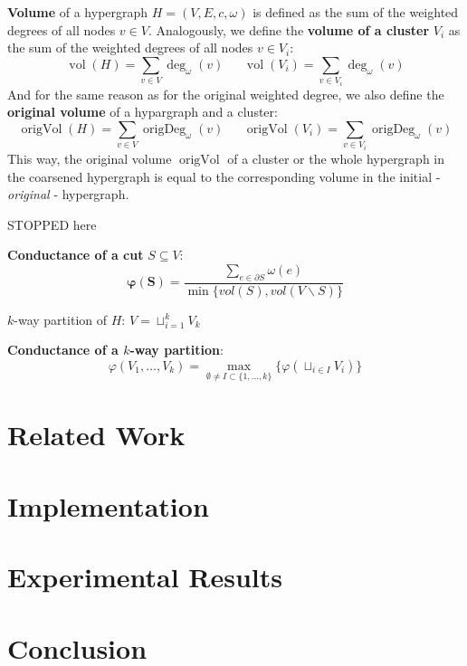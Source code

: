 \documentclass[acmsmall,nonacm,screen,review]{acmart}
\DeclareMathOperator{\vol}{vol}
\DeclareMathOperator{\origVol}{origVol}
\DeclareMathOperator{\origDeg}{origDeg}
\begin{document}
\textbf{Volume} of a hypergraph $H = (V, E, c, \omega)$ is defined as the 
sum of the weighted degrees of all nodes $v \in V$. Analogously, we define the \textbf{volume of a cluster} $V_i$ as the sum 
of the weighted degrees of all nodes $v \in V_i$:
\[\vol(H) = \sum_{v \in V} \deg_\omega(v) \ \ \ \ \ \ \
\vol(V_i) = \sum_{v \in V_i} \deg_\omega(v)\]
And for the same reason as for the original weighted degree, we also define 
the \textbf{original volume} of a hypargraph and a cluster:
\[\origVol(H) = \sum_{v \in V} \origDeg_\omega(v) \ \ \ \ \ \ \
\origVol(V_i) = \sum_{v \in V_i} \origDeg_\omega(v)\]
This way, the original volume $\origVol$ of a cluster or the whole hypergraph 
in the coarsened hypergraph is equal to the corresponding volume in the initial 
- \textit{original} - hypergraph.


STOPPED here

  \textbf{Conductance of a cut} $S \subseteq V$: 
  \[\mathbf{\varphi(S)} = \frac{\sum_{e \in \partial S}\omega(e)}{\min\{vol(S), vol(V \backslash S)\}}\]

  $k$-way partition of $H$: $V = \sqcup_{i = 1}^{k} V_k$

  \textbf{Conductance of a $k$-way partition}: 
  \[\varphi(V_1, \dots, V_k) = \max_{\emptyset \neq I \subset \{1, \dots, k\}}\{\varphi(\sqcup_{i \in I} V_i)\}\]






\section{Related Work}
\label{sec:related_work}

\section{Implementation}
\label{sec:implementation}

\section{Experimental Results}
\label{sec:experiments}

\section{Conclusion}
\label{sec:conclusion}





\end{document}
